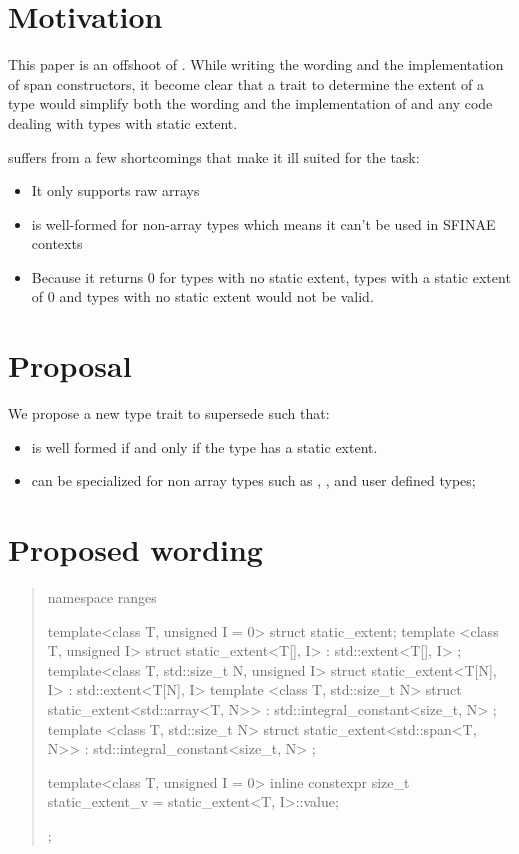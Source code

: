 \documentclass{wg21}
\begin{document}
\section{Motivation}

This paper is an offshoot of \cite{P1394}. While writing the wording and the implementation of span constructors, it become clear that
a trait to determine the extent of a type would simplify both the wording and the implementation of  and any code 
dealing with types with static extent.

 suffers from a few shortcomings that make it ill suited for the task:

\begin{itemize}
	\item It only supports raw arrays
	\item {} is well-formed for non-array types which means it can't be used in SFINAE contexts
	\item Because it returns 0 for types with no static extent, types with a static extent of 0 and types with no static extent would not be valid.
\end{itemize}

\section{Proposal}

We propose a new type trait  to supersede  such that:

\begin{itemize}
	\item {} is well formed if and only if the type has a static extent.
	\item {} can be specialized for non array types such as  , , 
	and user defined types;
\end{itemize}


\section{Proposed wording}

\begin{quote}
\begin{codeblock}

namespace ranges {
	template<class T, unsigned I = 0>
	struct static_extent;
	template <class T, unsigned I>
	struct static_extent<T[], I> : std::extent<T[], I> {};
	template<class T, std::size_t N, unsigned I>
	struct static_extent<T[N], I> : std::extent<T[N], I> {}
	template <class T, std::size_t N>
	struct static_extent<std::array<T, N>> : std::integral_constant<size_t, N> {};
	template <class T, std::size_t N>
	struct static_extent<std::span<T, N>> : std::integral_constant<size_t, N> {};
	
	template<class T, unsigned I = 0>
	inline constexpr size_t static_extent_v = static_extent<T, I>::value;
};

\end{codeblock}
\end{quote}
\end{document}
